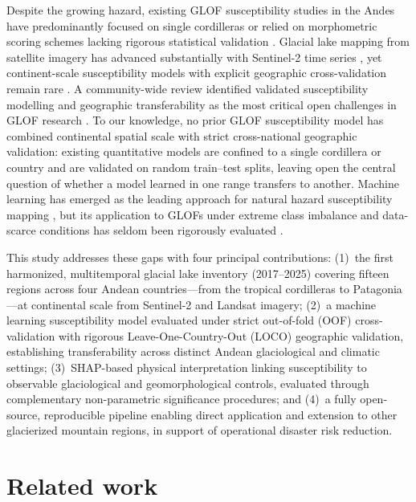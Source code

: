 \documentclass[pdflatex,sn-basic]{sn-jnl}%
\begin{document}
Despite the growing hazard, existing GLOF susceptibility studies in
the Andes have predominantly focused on single cordilleras
\citep{Emmer2020,EmmerHarrison2020,McKillop2007} or relied on
morphometric scoring schemes lacking rigorous statistical validation
\citep{Emmer2016,Hegglin2008,Frey2010}. Glacial lake mapping from
satellite imagery has advanced substantially with Sentinel-2 time
series \citep{Sentinel2MSI,Wangchuk2020}, yet continent-scale
susceptibility models with explicit geographic cross-validation
remain rare \citep{IribarrenAnacona2014}. A community-wide review
identified validated susceptibility modelling and geographic
transferability as the most critical open challenges in GLOF research
\citep{Pronk2022}. To our knowledge, no prior GLOF susceptibility model
has combined continental spatial scale with strict cross-national
geographic validation: existing quantitative models are confined to a
single cordillera or country and are validated on random train--test
splits, leaving open the central question of whether a model learned in one
range transfers to another. Machine learning has emerged as the leading
approach for natural hazard susceptibility mapping
\citep{Merghadi2020,Pourghasemi2020,Ghorbanzadeh2019}, but its
application to GLOFs under extreme class imbalance and data-scarce
conditions has seldom been rigorously evaluated \citep{He2009}.

This study addresses these gaps with four principal contributions:
(1)~the first harmonized, multitemporal glacial lake inventory (2017--2025)
covering fifteen regions across four Andean countries---from the tropical
cordilleras to Patagonia---at continental scale from Sentinel-2 and Landsat
imagery; (2)~a machine learning susceptibility
model evaluated under strict out-of-fold (OOF) cross-validation with rigorous
Leave-One-Country-Out (LOCO) geographic validation, establishing transferability
across distinct Andean glaciological and climatic settings;
(3)~SHAP-based physical interpretation linking susceptibility to
observable glaciological and geomorphological controls, evaluated through
complementary non-parametric significance procedures; and
(4)~a fully open-source, reproducible pipeline enabling direct application
and extension to other glacierized mountain regions, in support of
operational disaster risk reduction.

\section{Related work}\label{sec:related}
\end{document}
